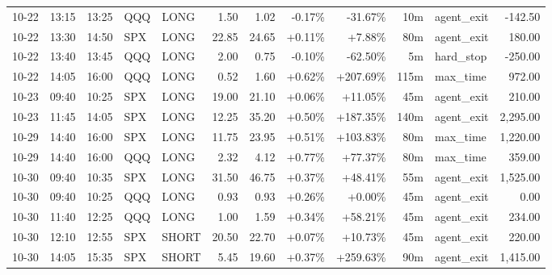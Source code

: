\documentclass[11pt,a4paper,twoside]{article}
\begin{document}
\begin{center}
\begin{longtable}{>{\color{txtmain}}l l l l l r r r r r >{\color{txtmain}}l r}
10-22 & 13:15 & 13:25 & QQQ & LONG & 1.50 & 1.02 & \textcolor{lossred}{-0.17\%} & \textcolor{lossred}{-31.67\%} & 10m & agent\_exit & \textcolor{lossred}{-142.50} \\
10-22 & 13:30 & 14:50 & SPX & LONG & 22.85 & 24.65 & \textcolor{wingreen}{+0.11\%} & \textcolor{wingreen}{+7.88\%} & 80m & agent\_exit & \textcolor{wingreen}{180.00} \\
10-22 & 13:40 & 13:45 & QQQ & LONG & 2.00 & 0.75 & \textcolor{lossred}{-0.10\%} & \textcolor{lossred}{-62.50\%} & 5m & hard\_stop & \textcolor{lossred}{-250.00} \\
10-22 & 14:05 & 16:00 & QQQ & LONG & 0.52 & 1.60 & \textcolor{wingreen}{+0.62\%} & \textcolor{wingreen}{+207.69\%} & 115m & max\_time & \textcolor{wingreen}{972.00} \\
10-23 & 09:40 & 10:25 & SPX & LONG & 19.00 & 21.10 & \textcolor{wingreen}{+0.06\%} & \textcolor{wingreen}{+11.05\%} & 45m & agent\_exit & \textcolor{wingreen}{210.00} \\
10-23 & 11:45 & 14:05 & SPX & LONG & 12.25 & 35.20 & \textcolor{wingreen}{+0.50\%} & \textcolor{wingreen}{+187.35\%} & 140m & agent\_exit & \textcolor{wingreen}{2,295.00} \\
10-29 & 14:40 & 16:00 & SPX & LONG & 11.75 & 23.95 & \textcolor{wingreen}{+0.51\%} & \textcolor{wingreen}{+103.83\%} & 80m & max\_time & \textcolor{wingreen}{1,220.00} \\
10-29 & 14:40 & 16:00 & QQQ & LONG & 2.32 & 4.12 & \textcolor{wingreen}{+0.77\%} & \textcolor{wingreen}{+77.37\%} & 80m & max\_time & \textcolor{wingreen}{359.00} \\
10-30 & 09:40 & 10:35 & SPX & LONG & 31.50 & 46.75 & \textcolor{wingreen}{+0.37\%} & \textcolor{wingreen}{+48.41\%} & 55m & agent\_exit & \textcolor{wingreen}{1,525.00} \\
10-30 & 09:40 & 10:25 & QQQ & LONG & 0.93 & 0.93 & \textcolor{wingreen}{+0.26\%} & \textcolor{wingreen}{+0.00\%} & 45m & agent\_exit & \textcolor{wingreen}{0.00} \\
10-30 & 11:40 & 12:25 & QQQ & LONG & 1.00 & 1.59 & \textcolor{wingreen}{+0.34\%} & \textcolor{wingreen}{+58.21\%} & 45m & agent\_exit & \textcolor{wingreen}{234.00} \\
10-30 & 12:10 & 12:55 & SPX & SHORT & 20.50 & 22.70 & \textcolor{wingreen}{+0.07\%} & \textcolor{wingreen}{+10.73\%} & 45m & agent\_exit & \textcolor{wingreen}{220.00} \\
10-30 & 14:05 & 15:35 & SPX & SHORT & 5.45 & 19.60 & \textcolor{wingreen}{+0.37\%} & \textcolor{wingreen}{+259.63\%} & 90m & agent\_exit & \textcolor{wingreen}{1,415.00} \\

\end{longtable}
\end{center}
\end{document}
